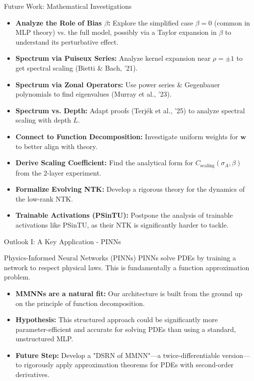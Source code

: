 \documentclass{beamer}
\begin{document}
\begin{frame}{Future Work: Mathematical Investigations}
\begin{itemize}
    \item \textbf{Analyze the Role of Bias $\beta$:} Explore the simplified case $\beta=0$ (common in MLP theory) vs. the full model, possibly via a Taylor expansion in $\beta$ to understand its perturbative effect.
    \item \textbf{Spectrum via Puiseux Series:} Analyze kernel expansion near $\rho=\pm 1$ to get spectral scaling (Bietti \& Bach, '21).
    \item \textbf{Spectrum via Zonal Operators:} Use power series & Gegenbauer polynomials to find eigenvalues (Murray et al., '23).
    \item \textbf{Spectrum vs. Depth:} Adapt proofs (Terjék et al., '25) to analyze spectral scaling with depth $L$.
    \item \textbf{Connect to Function Decomposition:} Investigate uniform weights for $\bm{w}$ to better align with theory.
    \item \textbf{Derive Scaling Coefficient:} Find the analytical form for $C_{\text{scaling}}(\sigma_A, \beta)$ from the 2-layer experiment.
    \item \textbf{Formalize Evolving NTK:} Develop a rigorous theory for the dynamics of the low-rank NTK.
    \item \textbf{Trainable Activations (PSinTU):} Postpone the analysis of trainable activations like PSinTU, as their NTK is significantly harder to tackle.
\end{itemize}
\end{frame}

\begin{frame}{Outlook I: A Key Application - PINNs}
\begin{block}{Physics-Informed Neural Networks (PINNs)}
PINNs solve PDEs by training a network to respect physical laws. This is fundamentally a function approximation problem.
\end{block}
\begin{itemize}
    \item \textbf{MMNNs are a natural fit:} Our architecture is built from the ground up on the principle of function decomposition.
    \item \textbf{Hypothesis:} This structured approach could be significantly more parameter-efficient and accurate for solving PDEs than using a standard, unstructured MLP.
    \item \textbf{Future Step:} Develop a "DSRN of MMNN"—a twice-differentiable version—to rigorously apply approximation theorems for PDEs with second-order derivatives.
\end{itemize}
\end{frame}
\end{document}
